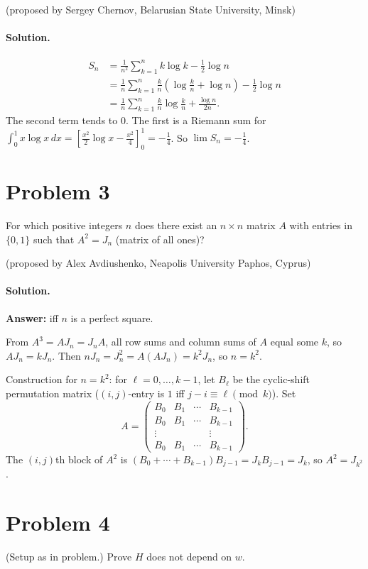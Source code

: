 \documentclass{article}
\begin{document}
(proposed by Sergey Chernov, Belarusian State University, Minsk)

\paragraph{Solution.}
\begin{align*}
S_n &= \frac{1}{n^2}\sum_{k=1}^n k \log k - \frac{1}{2}\log n \\
&= \frac{1}{n}\sum_{k=1}^n \frac{k}{n}\left(\log\frac{k}{n} + \log n\right) - \frac{1}{2}\log n \\
&= \frac{1}{n}\sum_{k=1}^n \frac{k}{n}\log\frac{k}{n} + \frac{\log n}{2n}.
\end{align*}
The second term tends to $0$. The first is a Riemann sum for $\int_0^1 x \log x\, dx = \left[\frac{x^2}{2}\log x - \frac{x^2}{4}\right]_0^1 = -\frac{1}{4}$. So $\lim S_n = -\frac{1}{4}$.

\section*{Problem 3}
For which positive integers $n$ does there exist an $n \times n$ matrix $A$ with entries in $\{0,1\}$ such that $A^2 = J_n$ (matrix of all ones)?

(proposed by Alex Avdiushenko, Neapolis University Paphos, Cyprus)

\paragraph{Solution.}
\textbf{Answer:} iff $n$ is a perfect square.

From $A^3 = A J_n = J_n A$, all row sums and column sums of $A$ equal some $k$, so $A J_n = k J_n$. Then $n J_n = J_n^2 = A(A J_n) = k^2 J_n$, so $n = k^2$.

Construction for $n = k^2$: for $\ell = 0, \ldots, k-1$, let $B_\ell$ be the cyclic-shift permutation matrix ($(i,j)$-entry is $1$ iff $j - i \equiv \ell \pmod k$). Set
\[
A = \begin{pmatrix} B_0 & B_1 & \cdots & B_{k-1} \\ B_0 & B_1 & \cdots & B_{k-1} \\ \vdots & & & \vdots \\ B_0 & B_1 & \cdots & B_{k-1} \end{pmatrix}.
\]
The $(i,j)$th block of $A^2$ is $(B_0 + \cdots + B_{k-1}) B_{j-1} = J_k B_{j-1} = J_k$, so $A^2 = J_{k^2}$.

\section*{Problem 4}
(Setup as in problem.) Prove $H$ does not depend on $w$.
\end{document}
